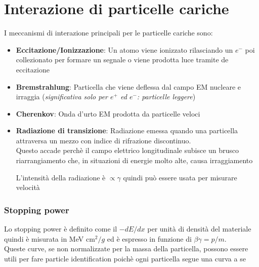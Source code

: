 \section{Interazione di particelle cariche}
I meccanismi di interazione principali per le particelle cariche sono:
\begin{itemize}

    \item \textbf{Eccitazione/Ionizzazione}: Un atomo viene ionizzato rilasciando un $e^-$ poi collezionato per formare un segnale o viene prodotta luce tramite de eccitazione

    \item \textbf{Bremstrahlung}: Particella che viene deflessa dal campo EM nucleare e irraggia (\textit{significativa solo per $e^+$ ed $e^{-}$: particelle leggere})

    \item \textbf{Cherenkov}: Onda d'urto EM prodotta da particelle veloci

    \item \textbf{Radiazione di transizione}: Radiazione emessa quando una particella attraversa un mezzo con indice di rifrazione discontinuo. \\
    Questo accade perchè il campo elettrico longitudinale subisce un brusco riarrangiamento che, in situazioni di energie molto alte, causa irraggiamento

    L'intensità della radiazione è $\propto \gamma$ quindi può essere usata per misurare velocità

\end{itemize}
    \subsubsection*{Stopping power}
        Lo stopping power è definito come il $-dE/dx$ per unità di densità del materiale quindi è misurata in MeV cm$^2/g$  ed è espresso in funzione di $\beta \gamma=p/m$.
        \\
        Queste curve, se non normalizzate per la massa della particella, possono essere utili per fare particle identification poichè ogni particella segue una curva a se

